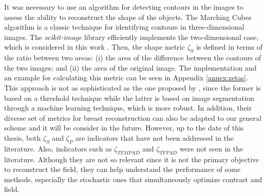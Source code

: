 			It was necessary to use an algorithm for detecting contours in the images to assess the ability to reconstruct the shape of the objects. The Marching Cubes algorithm \citep{lorensen1987marching} is a classic technique for identifying contours in three-dimensional images. The \textit{scikit-image} library efficiently implements the two-dimensional case, which is considered in this work \citep{walt2014scikit}. Then, the shape metric $\zeta_S$ is defined in terms of the ratio between two areas: (i) the area of the difference between the contours of the two images; and (ii) the area of the original image. The implementation and an example for calculating this metric can be seen in Appendix \ref{annex:zetas}. This approach is not as sophisticated as the one proposed by \cite{kurrant2021evaluating}, since the former is based on a threshold technique while the latter is based on image segmentation through a machine learning technique, which is more robust. In addition, their diverse set of metrics for breast reconstruction can also be adapted to our general scheme and it will be consider in the future. However, up to the date of this thesis, both $\zeta_S$ and $\zeta_{P}$ are indicators that have not been addressed in the literature. Also, indicators such as $\zeta_{TFMPAD}$ and $\zeta_{TFPAD}$ were not seen in the literature. Although they are not so relevant since it is not the primary objective to reconstruct the field, they can help understand the performance of some methods, especially the stochastic ones that simultaneously optimize contrast and field.
		
